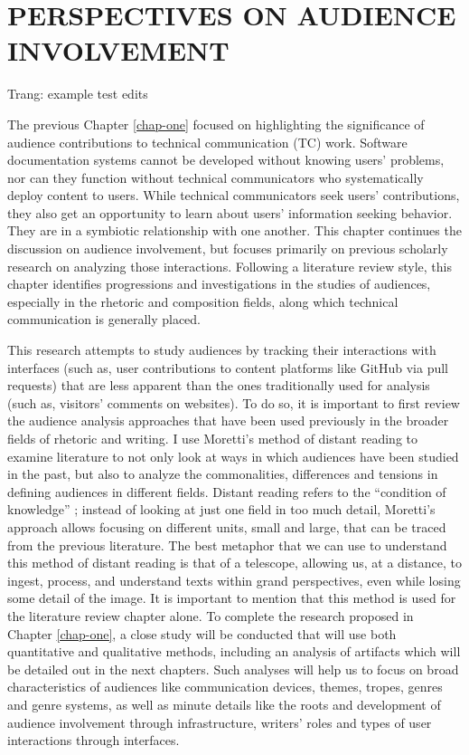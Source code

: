 \chapter{PERSPECTIVES ON AUDIENCE INVOLVEMENT}
\label{chap-two}

Trang: example test edits

The previous Chapter \ref{chap-one} focused on highlighting the significance of audience contributions to technical communication (TC) work. Software documentation systems cannot be developed without knowing users’ problems, nor can they function without technical communicators who systematically deploy content to users. While technical communicators seek users’ contributions, they also get an opportunity to learn about users’ information seeking behavior. They are in a symbiotic relationship with one another. This chapter continues the discussion on audience involvement, but focuses primarily on previous scholarly research on analyzing those interactions. Following a literature review style, this chapter identifies progressions and investigations in the studies of audiences, especially in the rhetoric and composition fields, along which technical communication is generally placed.

This research attempts to study audiences by tracking their interactions with interfaces (such as, user contributions to content platforms like GitHub via pull requests) that are less apparent than the ones traditionally used for analysis (such as, visitors’ comments on websites). To do so, it is important to first review the audience analysis approaches that have been used previously in the broader fields of rhetoric and writing. I use Moretti’s \cite{moretti2000conjectures} method of distant reading to examine literature to not only look at ways in which audiences have been studied in the past, but also to analyze the commonalities, differences and tensions in defining audiences in different fields. Distant reading refers to the “condition of knowledge” \cite{moretti2000conjectures}; instead of looking at just one field in too much detail, Moretti’s approach allows focusing on different units, small and large, that can be traced from the previous literature. The  best  metaphor  that  we  can  use  to understand this method of distant reading is that of a telescope, allowing us, at a distance, to ingest, process, and understand texts within grand perspectives, even while losing some detail of the image. It is important to mention that this method is used for the literature review chapter alone. To complete the research proposed in Chapter \ref{chap-one}, a close study will be conducted that will use both quantitative and qualitative methods, including an analysis of artifacts which will be detailed out in the next chapters. Such analyses will help us to focus on broad characteristics of audiences like communication devices, themes, tropes, genres and genre systems, as well as minute details like the roots and development of audience involvement through infrastructure, writers’ roles and types of user interactions through interfaces.

